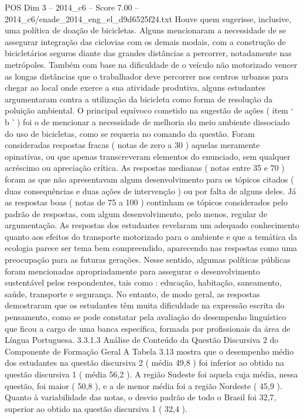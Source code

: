 \begin{textsample}{POS Dim 3 – 2014\_c6 – Score 7.00 – 2014\_c6/enade\_2014\_eng\_el\_d9d6525f24.txt}
Houve quem sugerisse, inclusive, uma política de doação de bicicletas.
Alguns mencionaram a necessidade de se assegurar integração das ciclovias com os demais modais, com a construção de bicicletários seguros diante das grandes distâncias a percorrer, notadamente nas metrópoles.
Também com base na dificuldade de o veículo não motorizado vencer as longas distâncias que o trabalhador deve percorrer nos centros urbanos para chegar ao local onde exerce a sua atividade produtiva, alguns estudantes argumentaram contra a utilização da bicicleta como forma de resolução da poluição ambiental.
O principal equívoco cometido na sugestão de ações ( item ‘ b ’ ) foi o de mencionar a necessidade de melhoria do meio ambiente dissociado do uso de bicicletas, como se requeria no comando da questão.
Foram consideradas respostas fracas ( notas de zero a 30 ) aquelas meramente opinativas, ou que apenas transcreveram elementos do enunciado, sem qualquer acréscimo ou apreciação crítica.
As respostas medianas ( notas entre 35 e 70 ) foram as que não apresentavam algum desenvolvimento para os tópicos citados ( duas consequências e duas ações de intervenção ) ou por falta de alguns deles.
Já as respostas boas ( notas de 75 a 100 ) continham os tópicos considerados pelo padrão de respostas, com algum desenvolvimento, pelo menos, regular de argumentação.
As respostas dos estudantes revelaram um adequado conhecimento quanto aos efeitos do transporte motorizado para o ambiente e que a temática da ecologia parece ser tema bem compreendido, aparecendo nas respostas como uma preocupação para as futuras gerações.
Nesse sentido, algumas políticas públicas foram mencionadas apropriadamente para assegurar o desenvolvimento sustentável pelos respondentes, tais como : educação, habitação, saneamento, saúde, transporte e segurança.
No entanto, de modo geral, as respostas demostraram que os estudantes têm muita dificuldade na expressão escrita do pensamento, como se pode constatar pela avaliação do desempenho linguístico que ficou a cargo de uma banca específica, formada por profissionais da área de Língua Portuguesa. 3.3.1.3 Análise de Conteúdo da Questão Discursiva 2 do Componente de Formação Geral A Tabela 3.13 mostra que o desempenho médio dos estudantes na questão discursiva 2 ( média 49,8 ) foi inferior ao obtido na questão discursiva 1 ( média 56,2 ).
A região Sudeste foi aquela cuja média, nessa questão, foi maior ( 50,8 ), e a de menor média foi a região Nordeste ( 45,9 ).
Quanto à variabilidade das notas, o desvio padrão de todo o Brasil foi 32,7, superior ao obtido na questão discursiva 1 ( 32,4 ).

\end{textsample}
